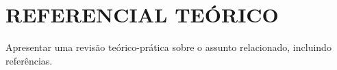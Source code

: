 \section{REFERENCIAL TEÓRICO} \label{sec:referencial}

Apresentar uma revisão teórico-prática sobre o assunto relacionado, incluindo referências.
